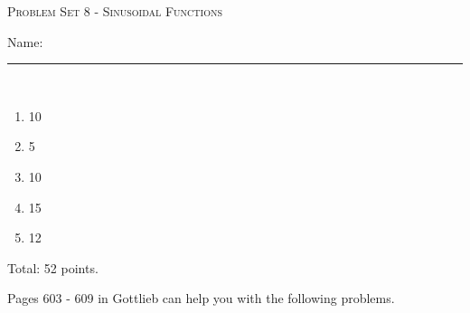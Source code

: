 \documentclass{article}
\begin{document}
\begin{center}
  \large\textsc{Problem Set 8 - Sinusoidal Functions}
  
      \pspace{12pt}
  \begin{problemonly}\large Name: \rule{5cm}{0.15mm}\\ \end{problemonly}
\end{center}

\begin{grading}
\begin{enumerate}
    \item 10
    \item 5
    \item 10
    \item 15
    \item 12
\end{enumerate}
Total: 52 points.
\end{grading}

 Pages 603 - 609 in Gottlieb can help you with the
  following problems.
\end{document}
